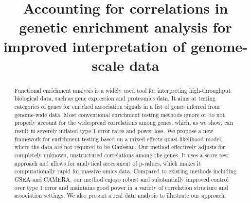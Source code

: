 \documentclass[useAMS,usenatbib, galley]{biom}
\title[This is an Example of Recto Running Head]{Accounting for correlations in genetic enrichment analysis for improved interpretation of genome-scale data}
\begin{document}




\label{firstpage}


\begin{abstract}
Functional enrichment analysis is a widely used tool for interpreting high-throughput biological data, such as gene expression and proteomics data. It aims at testing categories of genes for enriched association signals in a list of genes inferred from genome-wide data. Most conventional enrichment testing methods ignore or do not properly account for the widespread correlations among genes, which, as we show, can result in severely inflated type 1 error rates and power loss. We propose a new framework for enrichment testing based on a mixed effects quasi-likelihood model, where the data are not required to be Gaussian. Our method effectively adjusts for completely unknown, unstructured correlations among the genes. It uses a score test approach and allows for analytical assessment of p-values, which makes it computationally rapid for massive omics data. Compared to existing methods including GSEA and CAMERA, our method enjoys robust and substantially improved control over type 1 error and maintains good power in a variety of correlation structure and association settings. We also present a real data analysis to illustrate our approach.
\end{abstract}

%
%

\begin{keywords}
\end{keywords}

\maketitle
\end{document}
